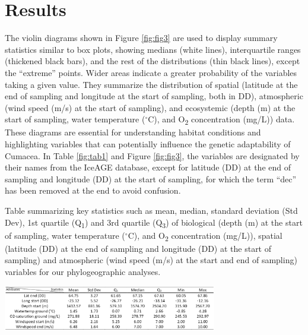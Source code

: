 {\section{Results}\label{results}
The violin diagrams shown in Figure \ref{fig:fig3} are used to display summary statistics similar to box plots, showing medians (white lines), interquartile ranges (thickened black bars), and the rest of the distributions (thin black lines), except the ``extreme'' points. Wider areas indicate a greater probability of the variables taking a given value. They summarize the distribution of spatial (latitude at the end of sampling and longitude at the start of sampling, both in DD), atmospheric (wind speed (m/s) at the start of sampling), and ecosystemic (depth (m) at the start of sampling, water temperature ($^\circ$C), and O\textsubscript{2} concentration (mg/L)) data. These diagrams are essential for understanding habitat conditions and highlighting variables that can potentially influence the genetic adaptability of Cumacea. In Table \ref{fig:tab1} and Figure \ref{fig:fig3}, the variables are designated by their names from the IceAGE database, except for latitude (DD) at the end of sampling and longitude (DD) at the start of sampling, for which the term ``dec'' has been removed at the end to avoid confusion.

\begin{table}[H]
    \centering
    \caption{Table summarizing key statistics such as mean, median, standard deviation (Std Dev), 1st quartile (Q\textsubscript{1}) and 3rd quartile (Q\textsubscript{3}) of biological (depth (m) at the start of sampling, water temperature ($^\circ$C), and O\textsubscript{2} concentration (mg/L)), spatial (latitude (DD) at the end of sampling and longitude (DD) at the start of sampling) and atmospheric (wind speed (m/s) at the start and end of sampling) variables for our phylogeographic analyses. \label{fig:tab1}}
    \includegraphics[width=0.7\textwidth]{Table_Attributes_Data.png}
\end{table}

}

